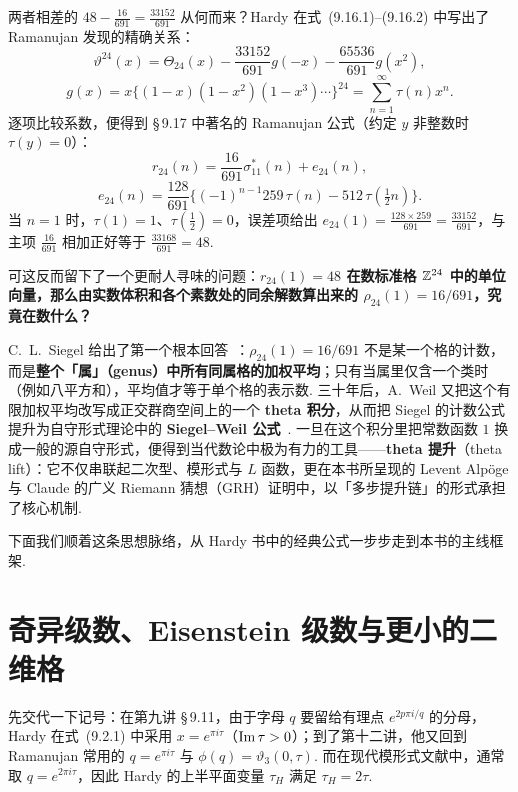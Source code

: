 两者相差的 $48-\frac{16}{691}=\frac{33152}{691}$ 从何而来？Hardy 在式~(9.16.1)--(9.16.2) 中写出了 Ramanujan 发现的精确关系：
\begin{equation*}\tag{9.16.1}
\vartheta^{24}(x)=\Theta_{24}(x)-\frac{33152}{691}g(-x)-\frac{65536}{691}g(x^2),
\end{equation*}
\begin{equation*}\tag{9.16.2}
g(x)=x\bigl\{(1-x)(1-x^2)(1-x^3)\cdots\bigr\}^{24}=\sum_{n=1}^{\infty}\tau(n)x^n.
\end{equation*}
逐项比较系数，便得到 \S\,9.17 中著名的 Ramanujan 公式（约定 $y$ 非整数时 $\tau(y)=0$）：
\begin{equation*}\tag{9.17.1}
r_{24}(n)=\frac{16}{691}\sigma_{11}^*(n)+e_{24}(n),
\end{equation*}
\begin{equation*}\tag{9.17.2}
e_{24}(n)=\frac{128}{691}\bigl\{(-1)^{n-1}259\,\tau(n)-512\,\tau(\tfrac12 n)\bigr\}.
\end{equation*}
当 $n=1$ 时，$\tau(1)=1$、$\tau(\tfrac12)=0$，误差项给出 $e_{24}(1)=\frac{128\times 259}{691}=\frac{33152}{691}$，与主项 $\frac{16}{691}$ 相加正好等于 $\frac{33168}{691}=48$.

可这反而留下了一个更耐人寻味的问题：\textbf{$r_{24}(1)=48$ 在数标准格 $\mathbb{Z}^{24}$ 中的单位向量，那么由实数体积和各个素数处的同余解数算出来的 $\rho_{24}(1)=16/691$，究竟在数什么？}

C.~L.~Siegel 给出了第一个根本回答~\cite{Siegel1935}：$\rho_{24}(1)=16/691$ 不是某一个格的计数，而是\textbf{整个「属」（genus）中所有同属格的加权平均}；只有当属里仅含一个类时（例如八平方和），平均值才等于单个格的表示数. 三十年后，A.~Weil 又把这个有限加权平均改写成正交群商空间上的一个 \textbf{theta 积分}，从而把 Siegel 的计数公式提升为自守形式理论中的 \textbf{Siegel--Weil 公式}~\cite{Weil1964,Weil1965}. 一旦在这个积分里把常数函数 $1$ 换成一般的源自守形式，便得到当代数论中极为有力的工具——\textbf{theta 提升}（theta lift）：它不仅串联起二次型、模形式与 $L$ 函数，更在本书所呈现的 Levent Alpöge 与 Claude 的广义 Riemann 猜想（GRH）证明中，以「多步提升链」的形式承担了核心机制.

下面我们顺着这条思想脉络，从 Hardy 书中的经典公式一步步走到本书的主线框架.

\section{奇异级数、Eisenstein 级数与更小的二维格}

先交代一下记号：在第九讲 \S\,9.11，由于字母 $q$ 要留给有理点 $e^{2p\pi i/q}$ 的分母，Hardy 在式~(9.2.1) 中采用 $x=e^{\pi i\tau}$（$\operatorname{Im}\tau>0$）；到了第十二讲，他又回到 Ramanujan 常用的 $q=e^{\pi i\tau}$ 与 $\phi(q)=\vartheta_3(0,\tau)$. 而在现代模形式文献中，通常取 $q=e^{2\pi i\tau}$，因此 Hardy 的上半平面变量 $\tau_H$ 满足 $\tau_H=2\tau$.

